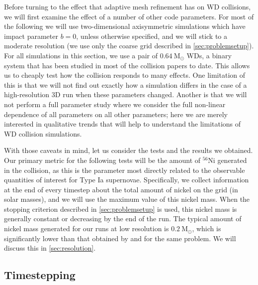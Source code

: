 \documentclass[twocolumn,numberedappendix]{../aastex6}
\newcommand{\msolar}{\mathrm{M}_\odot}
\begin{document}
Before turning to the effect that adaptive mesh refinement has on WD collisions,
we will first examine the effect of a number of other code parameters. For most
of the following we will use two-dimensional axisymmetric simulations which have
impact parameter $b = 0$, unless otherwise specified, and we will stick to a
moderate resolution (we use only the coarse grid described in \autoref{sec:problemsetup}).
For all simulations in this section, we use a pair of $0.64\ \msolar$ WDs, a binary
system that has been studied in most of the collision papers to date. This allows
us to cheaply test how the collision responds to many effects. One limitation of
this is that we will not find out exactly how a simulation differs in the case of a
high-resolution 3D run when these parameters changed. Another is that we will not
perform a full parameter study where we consider the full non-linear dependence of
all parameters on all other parameters; here we are merely interested in qualitative
trends that will help to understand the limitations of WD collision simulations.

With those caveats in mind, let us consider the tests and the results we obtained.
Our primary metric for the following tests will be the amount of $^{56}$Ni generated
in the collision, as this is the parameter most directly related to the observable
quantities of interest for Type Ia supernovae. Specifically, we collect information
at the end of every timestep about the total amount of nickel on the grid (in solar
masses), and we will use the maximum value of this nickel mass. When the stopping
criterion described in \autoref{sec:problemsetup} is used, this nickel mass is generally
constant or decreasing by the end of the run. The typical amount of nickel mass generated
for our runs at low resolution is $0.2\ \msolar$, which is significantly lower than
that obtained by \cite{raskin:2010} and \cite{kushnir:2013} for the same problem.
We will discuss this in \autoref{sec:resolution}.

\subsection{Timestepping}
\label{sec:parameters:timestepping}
\end{document}
